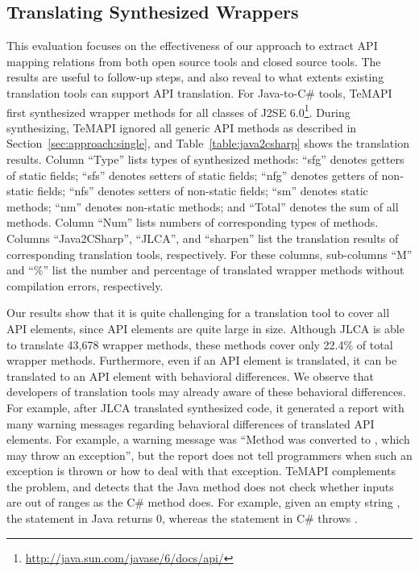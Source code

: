 \subsection{Translating Synthesized Wrappers}
\label{sec:evaluation:element}
This evaluation focuses on the effectiveness of our approach to extract API mapping relations from both open source tools and closed source tools. The results are useful to follow-up steps, and also reveal to what extents existing translation tools can support API translation. For Java-to-C\# tools, TeMAPI first synthesized wrapper methods for all classes of J2SE 6.0\footnote{\url{http://java.sun.com/javase/6/docs/api/}}. During synthesizing,  TeMAPI ignored all generic API methods as described in Section~\ref{sec:approach:single}, and Table~\ref{table:java2csharp} shows the translation results. Column ``Type'' lists types of synthesized methods: ``sfg'' denotes getters of static fields; ``sfs'' denotes setters of static fields; ``nfg'' denotes getters of non-static fields; ``nfs'' denotes setters of non-static fields; ``sm'' denotes static methods; ``nm'' denotes non-static methods; and ``Total'' denotes the sum of all methods. Column ``Num'' lists numbers of corresponding types of methods. Columns ``Java2CSharp'', ``JLCA'', and ``sharpen'' list the translation results of corresponding translation tools, respectively. For these columns, sub-columns ``M'' and ``\%'' list the number and percentage of translated wrapper methods without compilation errors, respectively.


Our results show that it is quite challenging for a translation tool to cover all API elements, since API elements are quite large in size. Although JLCA is able to translate 43,678 wrapper methods, these methods cover only 22.4\% of total wrapper methods. Furthermore, even if an API element is translated, it can be translated to an API element with behavioral differences. We observe that developers of translation tools may already aware of these behavioral differences. For example, after JLCA translated synthesized code, it generated a report with many warning messages regarding behavioral differences of translated API elements. For example, a warning message was ``Method  was converted to , which may throw an exception'', but the report does not tell programmers when such an exception is thrown or how to deal with that exception. TeMAPI complements the problem, and detects that the Java method does not check whether inputs are out of ranges as the C\# method does. For example, given an empty string , the  statement in Java returns 0, whereas the  statement in C\# throws .

